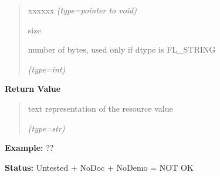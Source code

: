 \begin{boxedminipage}{\funcwidth}
\begin{quote}
\begin{Ventry}{xxxxxx}
            {\it (type=pointer to void)}

          \item[size]

          number of bytes, used only if dtype is FL\_STRING

            {\it (type=int)}

        \end{Ventry}

      \end{quote}

      \textbf{Return Value}
    \vspace{-1ex}

      \begin{quote}
      text representation of the resource value

      {\it (type=str)}

      \end{quote}

\textbf{Example:} ??



\textbf{Status:} Untested + NoDoc + NoDemo = NOT OK



    \end{boxedminipage}

    \label{xformslib:flxbasic:fl_set_resource}

    \vspace{0.5ex}

